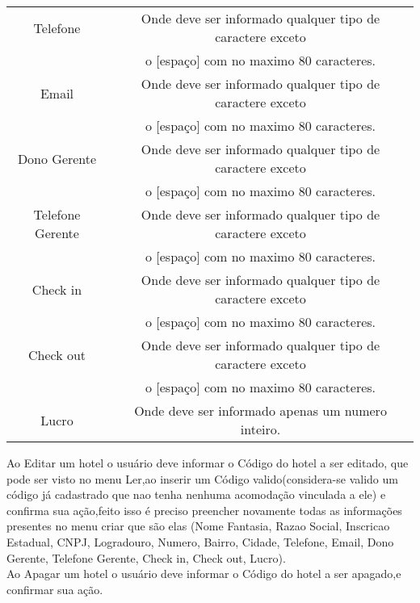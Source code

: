 \documentclass[titlepage]{article}
\begin{document}
\begin{table}[h]
\begin{tabular}{|c|c|}
						\hline
						Telefone & Onde deve ser informado qualquer tipo de caractere exceto \\ & o [espaço] com no maximo 80 caracteres.\\
						\hline
						Email & Onde deve ser informado qualquer tipo de caractere exceto \\ & o [espaço] com no maximo 80 caracteres.\\
						\hline
						Dono Gerente & Onde deve ser informado qualquer tipo de caractere exceto \\ & o [espaço] com no maximo 80 caracteres.\\
						\hline
						Telefone Gerente & Onde deve ser informado qualquer tipo de caractere exceto \\ & o [espaço] com no maximo 80 caracteres.\\
						\hline
						Check in & Onde deve ser informado qualquer tipo de caractere exceto \\ & o [espaço] com no maximo 80 caracteres.\\
						\hline
						Check out & Onde deve ser informado qualquer tipo de caractere exceto \\ & o [espaço] com no maximo 80 caracteres.\\
						\hline
						Lucro & Onde deve ser informado apenas um numero inteiro.\\
						\hline
					\end{tabular}
				\end{table}

			

				Ao Editar um hotel o usuário deve informar o Código do hotel a ser editado, que pode ser visto no menu Ler,ao inserir um Código valido(considera-se valido um código já cadastrado que nao tenha nenhuma acomodação vinculada a ele) e confirma sua ação,feito isso é preciso preencher novamente todas as informações presentes no menu criar que são elas (Nome Fantasia, Razao Social, Inscricao Estadual, CNPJ, 	Logradouro, Numero, Bairro, Cidade, 	Telefone, 	Email, 	Dono Gerente, 	Telefone Gerente, 	Check in, 	Check out, 	Lucro).\\

				Ao Apagar um hotel o usuário deve informar o Código do hotel a ser apagado,e confirmar sua ação. \\








				\newpage
\end{document}
